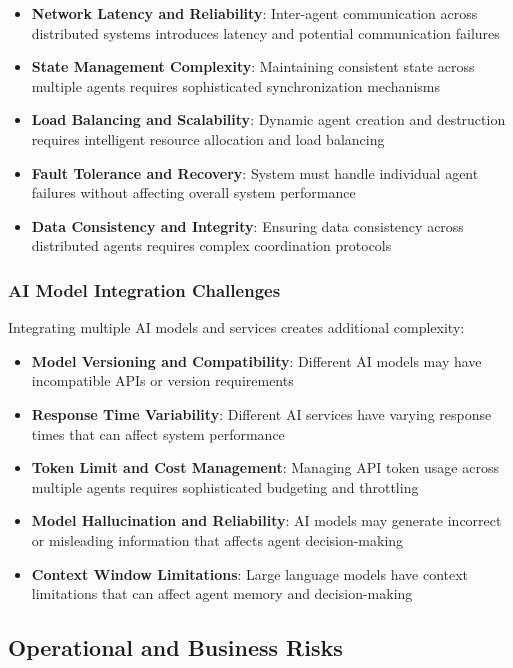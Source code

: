 \begin{itemize}
    \item \textbf{Network Latency and Reliability}: Inter-agent communication across distributed systems introduces latency and potential communication failures
    \item \textbf{State Management Complexity}: Maintaining consistent state across multiple agents requires sophisticated synchronization mechanisms
    \item \textbf{Load Balancing and Scalability}: Dynamic agent creation and destruction requires intelligent resource allocation and load balancing
    \item \textbf{Fault Tolerance and Recovery}: System must handle individual agent failures without affecting overall system performance
    \item \textbf{Data Consistency and Integrity}: Ensuring data consistency across distributed agents requires complex coordination protocols
\end{itemize}

\subsubsection{AI Model Integration Challenges}

Integrating multiple AI models and services creates additional complexity:

\begin{itemize}
    \item \textbf{Model Versioning and Compatibility}: Different AI models may have incompatible APIs or version requirements
    \item \textbf{Response Time Variability}: Different AI services have varying response times that can affect system performance
    \item \textbf{Token Limit and Cost Management}: Managing API token usage across multiple agents requires sophisticated budgeting and throttling
    \item \textbf{Model Hallucination and Reliability}: AI models may generate incorrect or misleading information that affects agent decision-making
    \item \textbf{Context Window Limitations}: Large language models have context limitations that can affect agent memory and decision-making
\end{itemize}

\subsection{Operational and Business Risks}

